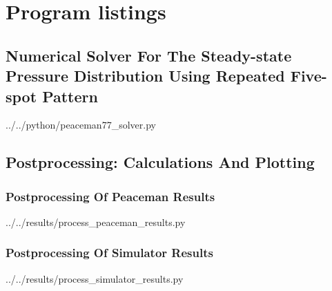\section{Program listings} %
\label{sec:program_listings}

\subsection{Numerical Solver For The Steady-state Pressure Distribution Using Repeated Five-spot Pattern} %
\label{sub:numerical_solver_for_the_steady_state_pressure_distribution_using_repeated_five_spot_pattern}


  {../../python/peaceman77_solver.py}

\clearpage
\subsection{Postprocessing: Calculations And Plotting} %
\label{sub:postprocessing_calculations_and_plotting}

\subsubsection{Postprocessing Of Peaceman Results} %
\label{ssub:postprocessing_of_peaceman_results}

  {../../results/process_peaceman_results.py}

\clearpage
\subsubsection{Postprocessing Of Simulator Results} %
\label{ssub:postprocessing_of_simulator_results}

  {../../results/process_simulator_results.py}


